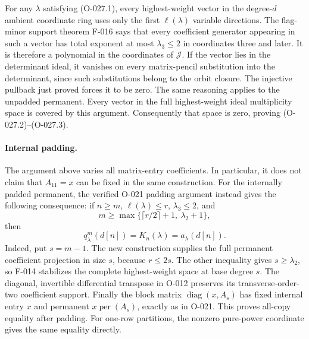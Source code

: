 For any \(\lambda\) satisfying (O-027.1), every highest-weight
vector in the degree-\(d\) ambient coordinate ring uses only
the first \(\ell(\lambda)\) variable directions.
The flag-minor support theorem F-016 says that every coefficient
generator appearing in such a vector has total exponent at
most \(\lambda_3\leq2\) in coordinates three and later.
It is therefore a polynomial in the coordinates of
\(\mathcal J\).
If the vector lies in the determinant ideal, it vanishes
on every matrix-pencil substitution into the determinant,
since such substitutions belong to the orbit closure.
The injective pullback just proved forces it to be zero.
The same reasoning applies to the unpadded permanent.
Every vector in the full highest-weight ideal multiplicity
space is covered by this argument. Consequently that space
is zero, proving (O-027.2)--(O-027.3).

\paragraph{Internal padding.}
The argument above varies all matrix-entry coefficients.
In particular, it does not claim that \(A_{11}=x\) can be
fixed in the same construction.
For the internally padded permanent, the verified O-021
padding argument instead gives the following consequence:
if \(n\geq m\), \(\ell(\lambda)\leq r\), \(\lambda_3\leq2\),
and
\[
                  m\geq
                \max\{\lceil r/2\rceil+1,\ \lambda_2+1\},
                                                               \tag{O-027.15}
\]
then
\[
                           q^m_\lambda(d[n])
                         =K_n(\lambda)=a_\lambda(d[n]).
                                                               \tag{O-027.16}
\]
Indeed, put \(s=m-1\). The new construction supplies the
full permanent coefficient projection in size \(s\), because
\(r\leq2s\). The other inequality gives \(s\geq\lambda_2\),
so F-014 stabilizes the complete highest-weight space at
base degree \(s\). The diagonal, invertible differential
transpose in O-012 preserves its transverse-order-two
coefficient support. Finally the block matrix
\(\operatorname{diag}(x,A_s)\) has fixed internal entry \(x\)
and permanent \(x\operatorname{per}(A_s)\), exactly as in
O-021. This proves all-copy equality after padding.
For one-row partitions, the nonzero pure-power coordinate
gives the same equality directly.

